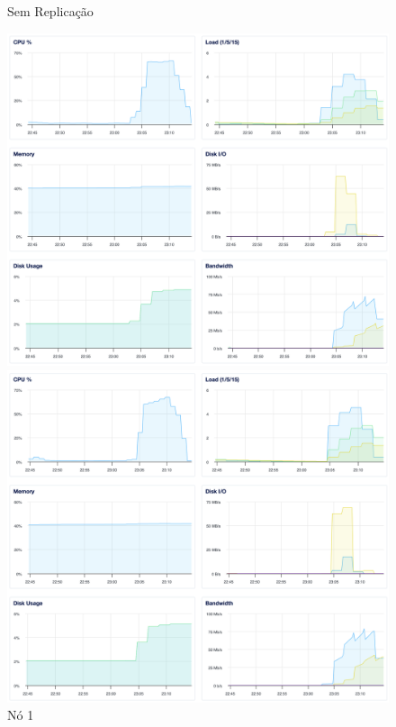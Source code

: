 \begin{figure}[H]
	\captionsetup{labelformat=empty}
  	\caption{Sem Replicação}
	\centering
  \begin{minipage}{0.32\linewidth}
    \centering
    \includegraphics[width=\linewidth]{imgs/3-1-01.png}
    \caption{Nó 1}
  \end{minipage}
  \hfill
  \begin{minipage}{0.32\linewidth}
    \centering
    \includegraphics[width=\linewidth]{imgs/3-1-02.png}

\end{minipage}
\end{figure}
